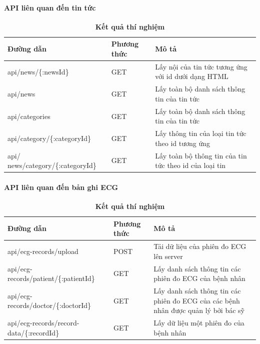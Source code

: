 \paragraph{API liên quan đến tin tức}
\mbox{}

\begin{table}[H]
  \centering
  \caption{\bfseries \fontsize{12pt}{0pt}\selectfont Kết quả thí nghiệm}
  \begin{tabularx}{0.9\textwidth}{
  | >{\raggedright\arraybackslash}X
  | >{\raggedright\arraybackslash}m{2cm}
  | >{\raggedright\arraybackslash}X|
  }
  \hline
  \bfseries Đường dẫn    &\bfseries Phương thức    &\bfseries Mô tả\\ \hline
 api/news/\{:newsId\}   &   GET  & Lấy nội của tin tức tương ứng với id dưới dạng HTML \\ \hline
 api/news   &    GET    & Lấy toàn bộ danh sách thông tin của tin tức \\ \hline
 api/categories  &   GET     & Lấy toàn bộ danh sách thông tin của tin tức \\ \hline
 api/category/\{:categoryId\}   &     GET   & Lấy thông tin của loại tin tức theo id tương ứng \\ \hline
 api/ news/category/\{:categoryId\} &   GET     & Lấy toàn bộ thông tin của tin tức theo id của loại tin \\ \hline

  \end{tabularx}
  \label{bang41}
\end{table}

\paragraph{API liên quan đến bản ghi ECG}
\mbox{}

\begin{table}[H]
  \centering
  \caption{\bfseries \fontsize{12pt}{0pt}\selectfont Kết quả thí nghiệm}
  \begin{tabularx}{0.9\textwidth}{
  | >{\raggedright\arraybackslash}X
  | >{\raggedright\arraybackslash}m{2cm}
  | >{\raggedright\arraybackslash}X|
  }
  \hline
  \bfseries Đường dẫn    &\bfseries Phương thức    &\bfseries Mô tả\\ \hline
 api/ecg-records/upload   &   POST  & Tải dữ liệu của phiên đo ECG lên server \\ \hline
 api/ecg-records/patient/\{:patientId\}   &    GET    & Lấy danh sách thông tin các phiên đo ECG của bệnh nhân \\ \hline
 api/ecg-records/doctor/\{:doctorId\} &   GET     & Lấy danh sách thông tin các phiên đo ECG của các bệnh nhân được quản lý bởi bác sỹ \\ \hline
 api/ecg-records/record-data/\{:recordId\}  &     GET   & Lấy dữ liệu một phiên đo của bệnh nhân \\ \hline

  \end{tabularx}
  \label{bang41}
\end{table}



